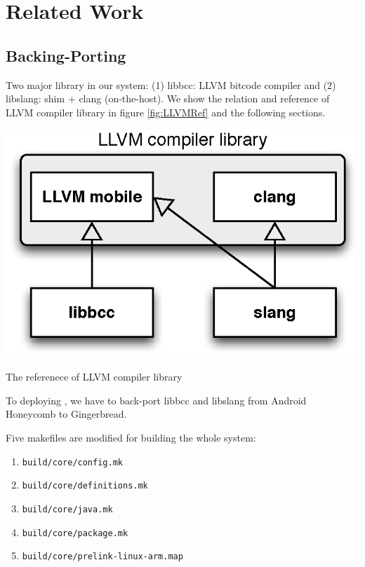 \chapter{Related Work}
\label{c:related}
\section{Backing-Porting}

Two major library in our \RRS{} system:
(1) libbcc: LLVM bitcode compiler and (2) libslang: shim + clang (on-the-host). We show the relation and reference of LLVM compiler library in figure \ref{fig:LLVMRef} and the following sections.

\begin{center-figure}
    \includegraphics[scale=0.8]{fig/LLVMRef.eps}
    \caption{The referenece of LLVM compiler library}
    \label{fig:LLVMRef}
\end{center-figure}

To deploying \RRS{}, we have to back-port libbcc and libslang from Android Honeycomb to Gingerbread.

Five makefiles are modified for building the whole system:
\begin{enumerate}
    \item \verb|build/core/config.mk|
    \item \verb|build/core/definitions.mk|
    \item \verb|build/core/java.mk|
    \item \verb|build/core/package.mk|
    \item \verb|build/core/prelink-linux-arm.map|
\end{enumerate}

